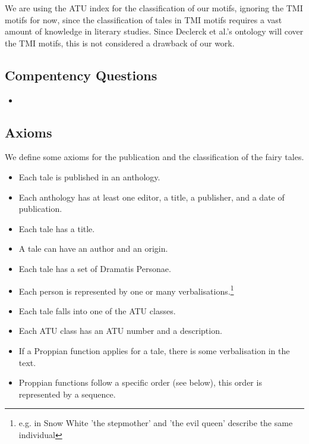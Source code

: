 \documentclass[10pt,a4paper]{article}
\begin{document}
We are using the ATU index for the classification of our motifs, ignoring the TMI motifs for now, since the classification of tales in TMI motifs requires a vast amount of  knowledge in literary studies. Since Declerck et al.'s ontology will cover the TMI motifs, this is not considered a drawback of our work. 

	 \subsection{Compentency Questions}
	 	\begin{itemize}
			\item
		\end{itemize}

	\subsection{Axioms}
	\label{axes}
We define some axioms for the publication and the classification of the fairy tales. 
	\small 

\begin{itemize}
		\item Each tale is published in an anthology. 
		\item Each anthology has at least one editor, a title, a publisher, and a date of publication.
		\item Each tale has a title.
		\item A tale can have an author and an origin.  
		\item Each tale has a set of Dramatis Personae. 
		\item Each person is represented by one or many verbalisations.\footnote{e.g. in Snow White 'the stepmother' and 'the evil queen' describe the same individual} 
		\item Each tale falls into one of the ATU classes. 
		\item Each ATU class has an ATU number and a description. 
		\item If a Proppian function applies for a tale, there is some verbalisation in the text. 
		\item Proppian functions follow a specific order (see below), this order is represented by a sequence. 
\end{itemize}
		
\end{document}
